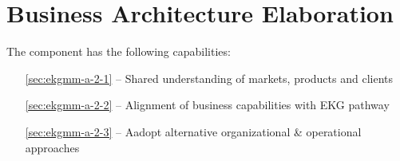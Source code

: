 \chapter{Business Architecture Elaboration}\label{ch:ekgmm-a-2} %

The  component has the following capabilities:

\begin{itemize}[leftmargin=.5in]
  \item [\ref{sec:ekgmm-a-2-1}]  -- Shared understanding of markets, products and clients
  \item [\ref{sec:ekgmm-a-2-2}]  -- Alignment of business capabilities with EKG pathway
  \item [\ref{sec:ekgmm-a-2-3}]  -- Aadopt alternative organizational \& operational approaches
\end{itemize}






